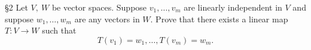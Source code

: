 \documentclass{homework}
\begin{document}



\begin{problem}{\S 2}
  Let $V,\ W$ be vector spaces. Suppose $v_1,\ldots,v_m$ are linearly independent in $V$ and suppose
  $w_1,\ldots,w_m$ are any vectors in $W$. Prove that there exists a linear map $T:V\to W$ such that
  \[
    T(v_1)=w_1,\ldots,T(v_m)=w_m
  .\] 
\end{problem}
\end{document}
